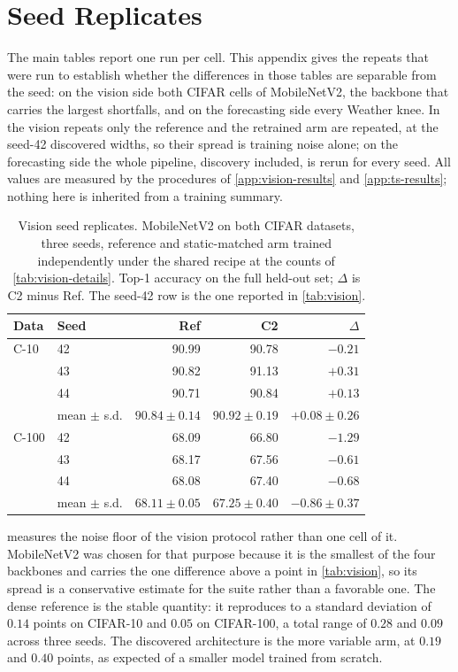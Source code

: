 \documentclass[10pt]{article}
\theoremstyle{paper}
\begin{document}
\section{Seed Replicates}
\label{app:seeds}
The main tables report one run per cell. This appendix gives the repeats that were run to
establish whether the differences in those tables are separable from the seed: on the vision
side both CIFAR cells of MobileNetV2, the backbone that carries the largest shortfalls, and on
the forecasting side every Weather knee. In the vision repeats only the reference and the retrained
arm are repeated, at the seed-42 discovered widths, so their spread is training noise alone; on the
forecasting side the whole pipeline, discovery included, is rerun for every seed.
All values are measured by the procedures of \cref{app:vision-results} and
\cref{app:ts-results}; nothing here is inherited from a training summary.

\begin{table}[h]
\centering
\caption{Vision seed replicates. MobileNetV2 on both CIFAR datasets, three seeds, reference and
static-matched arm trained independently under the shared recipe at the counts of
\cref{tab:vision-details}. Top-1 accuracy on the full held-out set; $\Delta$ is C2 minus Ref.
The seed-42 row is the one reported in \cref{tab:vision}.}
\label{tab:seed-vision}
\footnotesize
\setlength{\tabcolsep}{5.0pt}
\begin{tabular}{@{}llrrr@{}}
\toprule
Data & Seed & Ref & C2 & $\Delta$ \\
\midrule
C-10  & 42 & 90.99 & 90.78 & $-0.21$ \\
      & 43 & 90.82 & 91.13 & $+0.31$ \\
      & 44 & 90.71 & 90.84 & $+0.13$ \\
      & mean $\pm$ s.d. & $90.84\pm0.14$ & $90.92\pm0.19$ & $+0.08\pm0.26$ \\
\midrule
C-100 & 42 & 68.09 & 66.80 & $-1.29$ \\
      & 43 & 68.17 & 67.56 & $-0.61$ \\
      & 44 & 68.08 & 67.40 & $-0.68$ \\
      & mean $\pm$ s.d. & $68.11\pm0.05$ & $67.25\pm0.40$ & $-0.86\pm0.37$ \\
\bottomrule
\end{tabular}
\end{table}

 measures the noise floor of the vision protocol rather than one cell of it.
MobileNetV2 was chosen for that purpose because it is the smallest of the four backbones and
carries the one difference above a point in \cref{tab:vision}, so its spread is a
conservative estimate for the suite rather than a favorable one. The dense reference is the
stable quantity: it reproduces to a standard deviation of $0.14$ points on CIFAR-10 and $0.05$ on
CIFAR-100, a total range of $0.28$ and $0.09$ across three seeds. The discovered architecture is
the more variable arm, at $0.19$ and $0.40$ points, as expected of a smaller model trained from
scratch.
\end{document}
